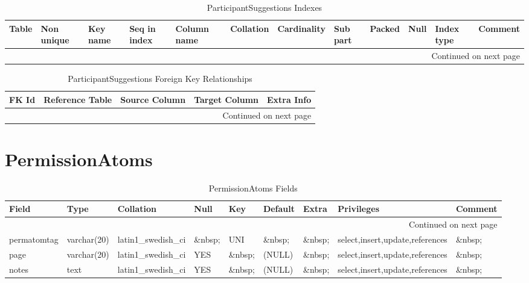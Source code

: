 \documentclass[tablesignature]{scrartcl}
\begin{document}
\begin{longtable}{|l|l|l|l|l|l|l|l|l|l|l|l|}
\caption{ParticipantSuggestions Indexes} \label{tbl:participantsuggestionsindexes}\\
\hline
 Table                   &  Non unique  &  Key name  &  Seq in index  &  Column name  &  Collation  &  Cardinality  &  Sub part  &  Packed  &  Null     &  Index type  &  Comment \\
\hline
\endhead
\hline\multicolumn{12}{r}{Continued on next page}\
\endfoot
\endlastfoot
\hline
 ParticipantSuggestions  &           0  &  PRIMARY   &             1  &  badgeid      &  A          &            1  &  (NULL)    &  (NULL)  &  \&nbsp;  &  BTREE       &  \&nbsp;  \\
\hline
\end{longtable}


\begin{longtable}{|l|l|l|l|l|}
\caption{ParticipantSuggestions Foreign Key Relationships} \label{tbl:participantsuggestionsfkr}\\
\hline
 FK Id                                &  Reference Table  &  Source Column  &  Target Column  &  Extra Info \\
\hline
\endhead
\hline\multicolumn{5}{r}{Continued on next page}\
\endfoot
\endlastfoot
\hline
 ParticipantSuggestions\_{}ibfk\_{}1  &  Participants     &  `badgeid`      &  `badgeid`      &              \\
\hline
\end{longtable}
\section{PermissionAtoms}
\label{sec-13}


\begin{longtable}{|l|l|l|l|l|l|l|l|l|}
\caption{PermissionAtoms Fields} \label{tbl:permissionatomsfields}\\
\hline
 Field        &  Type         &  Collation                &  Null     &  Key      &  Default  &  Extra              &  Privileges                       &  Comment \\
\hline
\endhead
\hline\multicolumn{9}{r}{Continued on next page}\
\endfoot
\endlastfoot
\hline
 permatomid   &  int(11)      &  NULL                     &  \&nbsp;  &  PRI      &  (NULL)   &  auto\_{}increment  &  select,insert,update,references  &  \&nbsp;  \\
 permatomtag  &  varchar(20)  &  latin1\_{}swedish\_{}ci  &  \&nbsp;  &  UNI      &  \&nbsp;  &  \&nbsp;            &  select,insert,update,references  &  \&nbsp;  \\
 page         &  varchar(20)  &  latin1\_{}swedish\_{}ci  &  YES      &  \&nbsp;  &  (NULL)   &  \&nbsp;            &  select,insert,update,references  &  \&nbsp;  \\
 notes        &  text         &  latin1\_{}swedish\_{}ci  &  YES      &  \&nbsp;  &  (NULL)   &  \&nbsp;            &  select,insert,update,references  &  \&nbsp;  \\
\hline
\end{longtable}
\end{document}
